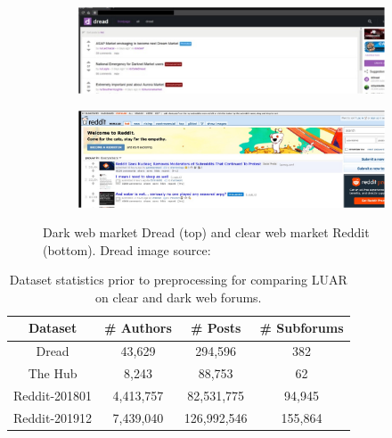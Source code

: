 \begin{figure}
    \centering
    \begin{subfigure}{0.9\linewidth}
       \includegraphics[width=\textwidth]{stylometryExtensions/figures/Dread} 
    \end{subfigure}
    \begin{subfigure}{0.9\linewidth}
       \includegraphics[width=\textwidth]{stylometryExtensions/figures/Reddit} 
    \end{subfigure}
    \caption{Dark web market Dread (top) and clear web market Reddit (bottom). Dread image source:~\citet{wiki:Dread}}
    \label{fig:stylometry_extensions:followingTrail:forums}
\end{figure}

\begin{table}
    \centering
    \begin{tabular}{cccc}
        \toprule
        Dataset &  \# Authors & \# Posts & \# Subforums\\
        \midrule
        Dread & 43,629 & 294,596 & 382 \\
        The Hub & 8,243 & 88,753 & 62 \\
        Reddit-201801 & 4,413,757 & 82,531,775 & 94,945 \\
        Reddit-201912 & 7,439,040 & 126,992,546 & 155,864 \\
        \bottomrule
    \end{tabular}
    \caption{Dataset statistics prior to preprocessing for comparing LUAR on clear and dark web forums.}
    \label{tab:stylometry_extensions:followingTrail:datasets}
\end{table}

